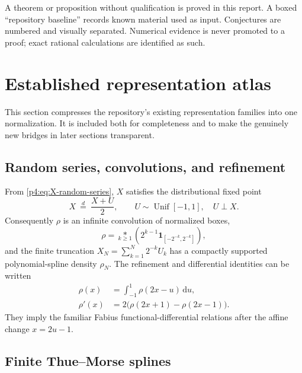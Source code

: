 \documentclass[11pt,oneside]{article}
\theoremstyle{definition}
\newcommand{\dd}{\,\mathrm d}
\begin{document}
A theorem or proposition without qualification is proved in this report. A boxed
``repository baseline'' records known material used as input. Conjectures are numbered and
visually separated. Numerical evidence is never promoted to a proof; exact rational
calculations are identified as such.

\section{Established representation atlas}
\label{p4:sec:baseline}

This section compresses the repository's existing representation families into one
normalization. It is included both for completeness and to make the genuinely new bridges
in later sections transparent.

\subsection{Random series, convolutions, and refinement}

From \eqref{p4:eq:X-random-series}, \(X\) satisfies the distributional fixed point
\begin{equation}
 X\ \stackrel d=\ \frac{X+U}{2},
 \qquad U\sim\operatorname{Unif}[-1,1],\quad U\perp X.
 \label{p4:eq:distribution-fixed-point}
\end{equation}
Consequently \(\rho\) is an infinite convolution of normalized boxes,
\begin{equation}
 \rho=\underset{k\ge1}{*}\left(2^{k-1}\mathbf1_{[-2^{-k},2^{-k}]}\right),
 \label{p4:eq:infinite-convolution}
\end{equation}
and the finite truncation \(X_N=\sum_{k=1}^{N}2^{-k}U_k\) has a compactly supported
polynomial-spline density \(\rho_N\). The refinement and differential identities can be
written
\begin{align}
 \rho(x)&=\int_{-1}^{1}\rho(2x-u)\dd u,
 \label{p4:eq:rho-refinement}\\
 \rho'(x)&=2\bigl(\rho(2x+1)-\rho(2x-1)\bigr).
 \label{p4:eq:rho-differential}
\end{align}
They imply the familiar Fabius functional-differential relations after the affine change
\(x=2u-1\).

\subsection{Finite Thue--Morse splines}
\end{document}
